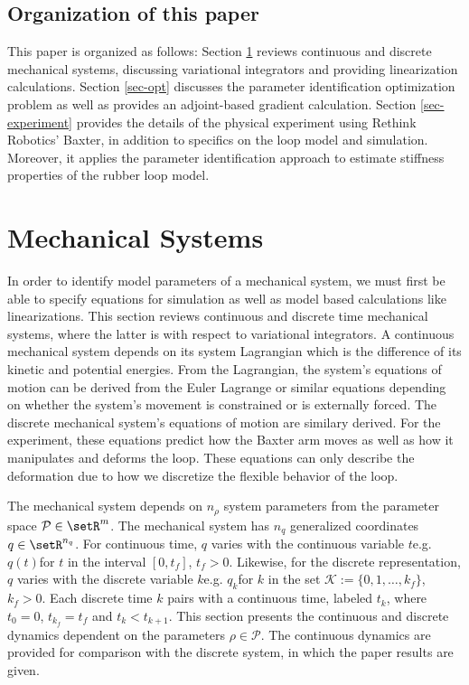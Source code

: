 \documentclass[letterpaper, 10pt, conference]{ieeeconf}
\begin{document}
\subsection{Organization of this paper}
This paper is organized as follows: Section \ref{sec-sys} reviews continuous and discrete mechanical systems, discussing variational integrators and providing linearization calculations.  Section \ref{sec-opt} discusses the parameter identification optimization problem as well as provides an adjoint-based gradient calculation.  Section \ref{sec-experiment} provides the details of the physical experiment using Rethink Robotics' Baxter, in addition to specifics on the loop model and simulation.  Moreover, it applies the parameter identification approach to estimate stiffness properties of the rubber loop model.

\section{Mechanical Systems}
\label{sec-sys}
In order to identify model parameters of a mechanical system, we must first be able to specify equations for simulation as well as model based calculations like linearizations.  This section reviews continuous and discrete time mechanical systems, where the latter is with respect to variational integrators.  A continuous mechanical system depends on its system Lagrangian which is the difference of its kinetic and potential energies.  From the Lagrangian, the system's equations of motion can be derived from the Euler Lagrange or similar equations depending on whether the system's movement is constrained or is externally forced.  The discrete mechanical system's equations of motion are similary derived.  For the experiment, these equations predict how the Baxter arm moves as well as how it manipulates and deforms the loop.  These equations can only describe the deformation due to how we discretize the flexible behavior of the loop.

The mechanical system depends on $n_\rho$ system parameters from the parameter space $\mathcal{P}\in\setR^m$. The mechanical system has $n_q$ generalized coordinates $q\in\setR^{n_q}$.  For continuous time, $q$ varies with the continuous variable $t$\textemdash e.g. $q(t)$\textemdash for $t$ in the interval $[0,t_f]$, $t_f>0$.  Likewise, for the discrete representation, $q$ varies with the discrete variable $k$\textemdash e.g. $q_k$\textemdash for $k$ in the set $\mathcal{K}:=\{0,1,\ldots,k_f\}$, $k_f>0$.  Each discrete time $k$ pairs with a continuous time, labeled $t_k$, where $t_0 = 0$, $t_{k_f} = t_f$ and $t_k<t_{k+1}$. This section presents the continuous and discrete dynamics dependent on the parameters $\rho\in\mathcal{P}$.  The continuous dynamics are provided for comparison with the discrete system, in which the paper results are given.
\end{document}

